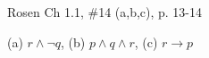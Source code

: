 \documentclass[12pt,addpoints]{exam}
\begin{document}
\begin{questions}
\question Rosen Ch 1.1, \#14 (a,b,c), p. 13-14
    \ifprintanswers
        \vspace{-15pt}
    \fi
    \begin{solution} (a) $r \wedge \neg q$, \hspace{0.2in} (b) $p \wedge q \wedge r$, \hspace{0.2in} (c) $r \rightarrow p$
    \end{solution}


\end{questions}
\end{document}
